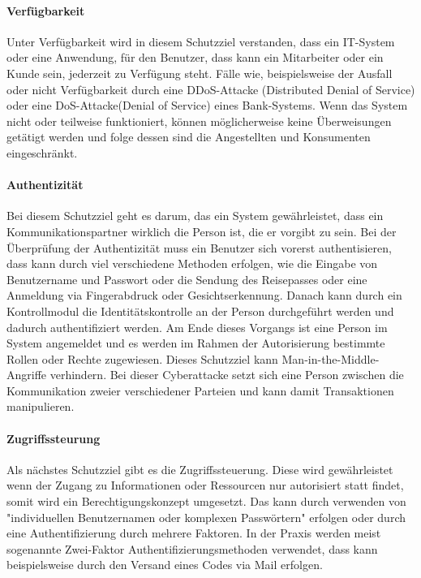 \paragraph{Verfügbarkeit}
Unter Verfügbarkeit wird in diesem Schutzziel verstanden, dass ein IT-System oder eine Anwendung, für den Benutzer, dass kann ein Mitarbeiter oder ein Kunde sein, jederzeit zu Verfügung steht. Fälle wie, beispielsweise der Ausfall oder nicht Verfügbarkeit durch eine DDoS-Attacke  (Distributed Denial of Service) oder eine DoS-Attacke(Denial of Service) eines Bank-Systems. Wenn das System nicht oder teilweise funktioniert, können möglicherweise keine Überweisungen getätigt werden und folge dessen sind die Angestellten und Konsumenten eingeschränkt. 

\paragraph{Authentizität}
Bei diesem Schutzziel geht es darum, das ein System gewährleistet, dass ein Kommunikationspartner wirklich die Person ist, die er vorgibt zu sein. Bei der Überprüfung der Authentizität muss ein Benutzer sich vorerst authentisieren, dass kann durch viel verschiedene Methoden erfolgen, wie die Eingabe von Benutzername und Passwort oder die Sendung des Reisepasses oder eine Anmeldung via Fingerabdruck oder Gesichtserkennung. Danach kann durch ein Kontrollmodul die Identitätskontrolle an der Person durchgeführt werden und dadurch authentifiziert werden. Am Ende dieses Vorgangs ist eine Person im System angemeldet und es werden im Rahmen der Autorisierung bestimmte Rollen oder Rechte zugewiesen.
Dieses Schutzziel kann Man-in-the-Middle-Angriffe verhindern. Bei dieser Cyberattacke setzt sich eine Person zwischen die Kommunikation zweier verschiedener Parteien und kann damit Transaktionen manipulieren. 

\paragraph{Zugriffssteurung}
Als nächstes Schutzziel gibt es die Zugriffssteuerung. Diese wird gewährleistet wenn der Zugang zu Informationen oder Ressourcen nur autorisiert statt findet, somit wird ein Berechtigungskonzept umgesetzt. Das kann durch verwenden von "individuellen Benutzernamen oder komplexen Passwörtern" erfolgen oder durch eine Authentifizierung durch mehrere Faktoren. In der Praxis werden meist sogenannte Zwei-Faktor Authentifizierungsmethoden verwendet, dass kann beispielsweise durch den Versand eines Codes via Mail erfolgen.

